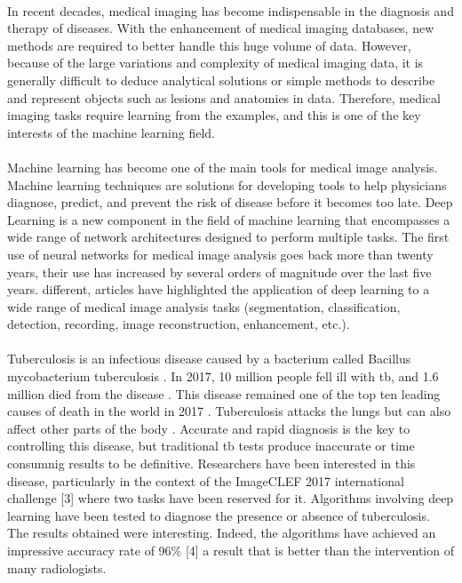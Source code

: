 \paragraph{}
In recent decades, medical imaging has become indispensable in the diagnosis and therapy of diseases. With the enhancement of medical imaging databases, new methods are required to better handle this huge volume of data. However, because of the large variations and complexity of medical imaging data, it is generally difficult to deduce analytical solutions or simple methods to describe and represent objects such as lesions and anatomies in data. Therefore, medical imaging tasks require learning from the examples, and this is one of the key interests of the machine learning field.
\paragraph{}
Machine learning has become one of the main tools for medical image analysis. Machine learning techniques are solutions for developing tools to help physicians diagnose, predict, and prevent the risk of disease before it becomes too late. Deep Learning is a new component in the field of machine learning that encompasses a wide range of network architectures designed to perform multiple tasks. The first use of neural networks for medical image analysis goes back more than twenty years, their use has increased by several orders of magnitude over the last five years. different, articles \cite{NNMEEX:1,NNMEEX:2,NNMEEX:3,NNMEEX:4,NNMEEX:5} have highlighted the application of deep learning to a wide range of medical image analysis tasks (segmentation, classification, detection, recording, image reconstruction, enhancement, etc.).
\paragraph{}
Tuberculosis is an infectious disease caused by a bacterium called Bacillus mycobacterium tuberculosis \cite{TBT:1}. In 2017, 10 million people fell ill with \ac{tb}, and 1.6 million died from the disease \cite{TBT:1}. This disease remained one of the top ten leading causes of death in the world in 2017 \cite{TBT:1}. Tuberculosis attacks the lungs but can also affect other parts of the body \cite{TBT:2}. Accurate and rapid diagnosis is the key to controlling this disease, but traditional \ac{tb} tests produce inaccurate or time consumnig results to be definitive. Researchers have been interested in this disease, particularly in the context of the ImageCLEF 2017 international challenge [3] where two tasks have been reserved for it. Algorithms involving deep learning have been tested to diagnose the presence or absence of tuberculosis. The results obtained were interesting. Indeed, the algorithms have achieved an impressive accuracy rate of 96\% [4] a result that is better than the intervention of many radiologists.
